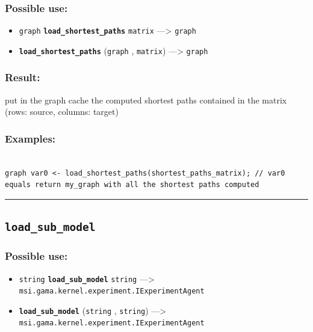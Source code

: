 \documentclass[]{book}
\providecommand{\tightlist}{%
  \setlength{\itemsep}{0pt}\setlength{\parskip}{0pt}}
\theoremstyle{definition}
\theoremstyle{definition}
\theoremstyle{definition}
\theoremstyle{remark}
\begin{document}
\subsubsection{Possible use:}\label{possible-use-327}

\begin{itemize}
\tightlist
\item
  \texttt{graph} \textbf{\texttt{load\_shortest\_paths}} \texttt{matrix}
  ---\textgreater{} \texttt{graph}
\item
  \textbf{\texttt{load\_shortest\_paths}} (\texttt{graph} ,
  \texttt{matrix}) ---\textgreater{} \texttt{graph}
\end{itemize}

\subsubsection{Result:}\label{result-317}

put in the graph cache the computed shortest paths contained in the
matrix (rows: source, columns: target)

\subsubsection{Examples:}\label{examples-227}

\begin{verbatim}
 
graph var0 <- load_shortest_paths(shortest_paths_matrix); // var0 equals return my_graph with all the shortest paths computed
\end{verbatim}

\begin{center}\rule{0.5\linewidth}{\linethickness}\end{center}

\subsection{\texorpdfstring{\texttt{load\_sub\_model}}{load\_sub\_model}}\label{load_sub_model}

\subsubsection{Possible use:}\label{possible-use-328}

\begin{itemize}
\tightlist
\item
  \texttt{string} \textbf{\texttt{load\_sub\_model}} \texttt{string}
  ---\textgreater{} \texttt{msi.gama.kernel.experiment.IExperimentAgent}
\item
  \textbf{\texttt{load\_sub\_model}} (\texttt{string} , \texttt{string})
  ---\textgreater{} \texttt{msi.gama.kernel.experiment.IExperimentAgent}
\end{itemize}
\end{document}
